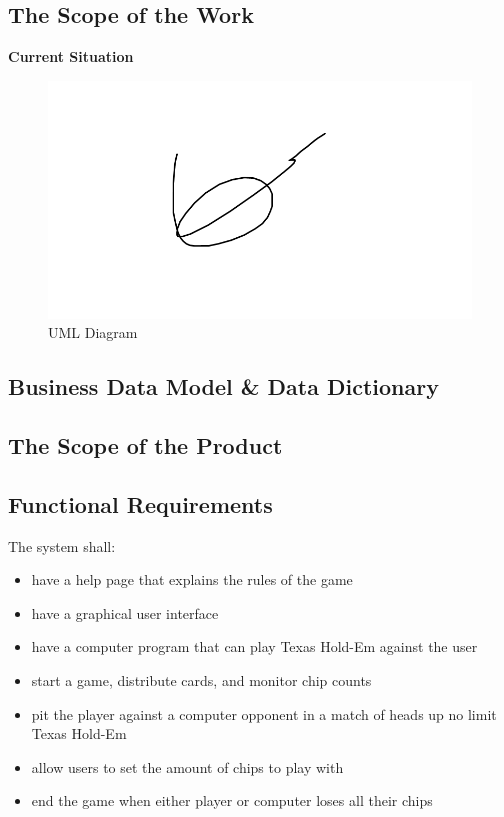 \documentclass[12pt]{article}
\begin{document}
	\subsection{The Scope of the Work}
	\textbf{Current Situation}
		\begin{figure}[h]
		\includegraphics[scale=0.5]{test.png}
		\caption{UML Diagram}
		\label{fig1: UML}
		\end{figure}
	\subsection{Business Data Model \& Data Dictionary}
	\subsection{The Scope of the Product}
	\subsection{Functional Requirements}
	The system shall:
	\begin{itemize}
	\item 	have a help page that explains the rules of the game
	\item 	have a graphical user interface
	\item 	have a computer program that can play Texas Hold-Em against the user
	\item 	start a game, distribute cards, and monitor chip counts
	\item	pit the player against a computer opponent in a match of heads up no limit 					Texas Hold-Em
	\item 	allow users to set the amount of chips to play with
	\item 	end the game when either player or computer loses all their chips
	\end{itemize}
	
\end{document}
